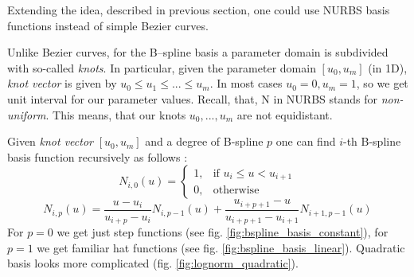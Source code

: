 Extending the idea, described in previous section, one could use NURBS \cite{farin1999nurbs} basis functions instead of simple Bezier curves. 

Unlike Bezier curves, for the B--spline basis a parameter domain is subdivided with so-called \textit{knots}. In particular, given the parameter domain $[u_{0}, u_{m}]$ (in 1D), \textit{knot vector} is given by $u_{0} \leq u_{1} \leq ... \leq u_{m}$. In most cases $u_{0} = 0, u_{m} = 1$, so we get unit interval for our parameter values. Recall, that, N in NURBS stands for \textit{non-uniform}. This means, that our knots $u_{0},..., u_{m}$ are not equidistant. %

Given \textit{knot vector} $[u_{0}, u_{m}]$ and a degree of B-spline $p$ one can find $i$-th B-spline basis function recursively as follows \cite{farin1999nurbs}:
\begin{equation}
N_{i,0}(u) =  \begin{cases} 1, & \mbox{if } u_{i} \leq u < u_{i+1} \\ 0, & \mbox{otherwise } \end{cases}
\end{equation} 
\begin{equation}
N_{i,p}(u) = \frac{u - u_{i}}{u_{i+p} - u_{i}}N_{i, p-1}(u)  + \frac{u_{i+p+1}-u}{u_{i+p+1} - u_{i+1}}N_{i+1, p-1}(u)
\end{equation}
For $p=0$ we get just step functions (see fig. \ref{fig:bspline_basis_constant}), for $p=1$ we get familiar hat functions (see fig. \ref{fig:bspline_basis_linear}). Quadratic basis looks more complicated (fig. \ref{fig:lognorm_quadratic}).
